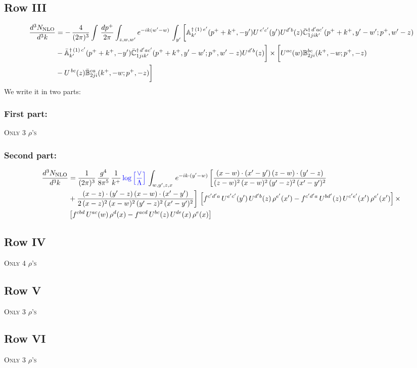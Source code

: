 \documentclass[9pt]{article}
\def\mf#1{\mathbb{#1}}
\numberwithin{equation}{section}
\begin{document}
 \subsection{{\color{green}Row III}}
 \begin{align}
    \frac{d^{3}N_{\rm NLO}}{d^{3}k} & =   -\,\frac{4}{(2\pi)^{3}} \int\, \frac{dp^{+}}{2\pi}\int_{z,w,w^{\prime}} e^{-ik(w^{\prime}-w)}\,\int_{y^{\prime}}\bigg[\mf{A}^{\dagger\, (1)\,e^{\prime}}_{k^{\prime}}(p^{+}+k^{+},-y^{\prime})U^{\, e^{\prime}c^{\prime}}(y^{\prime})U^{d^{\prime}b}(z) \Bar{\mf{C}}^{\dagger\, d^{\prime}ac^{\prime}}_{1jik^{\prime}}(p^{+}+k^{+},y^{\prime}-w^{\prime}; p^{+},w^{\prime}-z)\notag \\ &  -\Bar{\mf{A}}^{\dagger\, (1)\,c^{\prime}}_{k^{\prime}}(p^{+}+k^{+},-y^{\prime}) \Bar{\mf{C}}^{\dagger\, d^{\prime}ac^{\prime}}_{1jik^{\prime}}(p^{+}+k^{+},y^{\prime}-w^{\prime}; p^{+},w^{\prime}-z)U^{d^{\prime}b}(z)\bigg] \times \bigg[U^{ac}(w) \mf{B}^{bc}_{2ji}(k^{+},-w;p^{+},-z)\notag \\ &  -U^{\, bc}(z)\Bar{\mf{B}}^{ca}_{2ji}(k^{+},-w; p^{+},-z)\bigg]\nonumber
\end{align}
We write it in two parts:
\subsubsection{First part:}
\textsc{Only 3 $\rho$'s}
\subsubsection{Second part:}
\begin{align}
      \frac{d^{3}N_{\rm NLO}}{d^{3}k} & = \frac{1}{(2\pi)^{3}}\,\frac{g^{4}}{8\pi^{5}}\,\frac{1}{k^{+}}\,{\color{blue}\log{\left[\frac{\vee}{\Lambda}\right]}}\,\int_{w,y',z,x}\, e^{-ik\cdot (y'-w)}\,\bigg[\frac{(x-w)\cdot (x'-y')\,(z-w)\cdot (y'-z)}{(z-w)^{2}\,(x-w)^{2}\,(y'-z)^{2}\,(x'-y')^{2}}\notag \\ & +\frac{(x-z)\cdot (y'-z)\,(x-w)\cdot (x'-y')}{2\,(x-z)^{2}\,(x-w)^{2}\,(y'-z)^{2}\,(x'-y')^{2}}\bigg]\, \left[f^{c'd'a}\,U^{e'c'}(y')\,U^{d'b}(z)\,\rho^{e'}(x')-f^{c'd'a}\, 
    U^{bd'}(z)\,U^{c'e'}(x')\,\rho^{e'}(x')\right]\times\notag \\ &  \left[f^{cbd}\,U^{ac}(w)\,\rho^{d}(x) -f^{acd}\,U^{bc}(z)\,U^{de}(x)\,\rho^{e}(x)\right] 
\end{align}
\subsection{Row IV}
\textsc{Only 4 $\rho$'s}
\subsection{Row V}
\textsc{Only 3 $\rho$'s}
\subsection{Row VI}
\textsc{Only 3 $\rho$'s}
\end{document}

